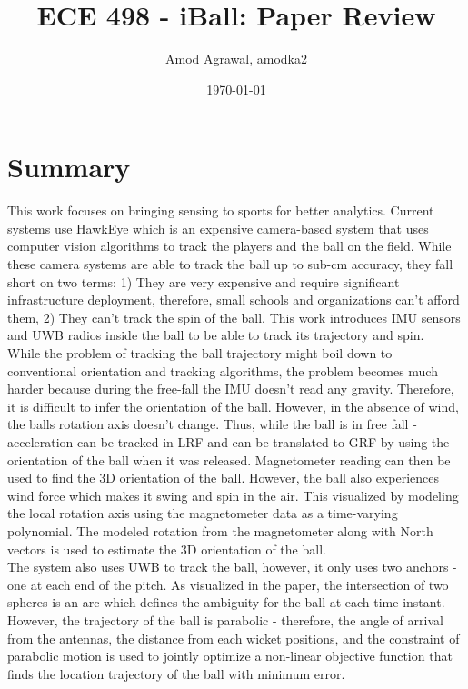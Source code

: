 \documentclass[a4paper]{article}
\title{ECE 498 - iBall: Paper Review}
\author{Amod Agrawal, amodka2}
\date{\today}
\begin{document}
\maketitle
\section{Summary}
This work focuses on bringing sensing to sports for better analytics. Current systems use HawkEye which is an expensive camera-based system that uses computer vision algorithms to track the players and the ball on the field. While these camera systems are able to track the ball up to sub-cm accuracy, they fall short on two terms: 1) They are very expensive and require significant infrastructure deployment, therefore, small schools and organizations can't afford them, 2) They can't track the spin of the ball. This work introduces IMU sensors and UWB radios inside the ball to be able to track its trajectory and spin.\\

While the problem of tracking the ball trajectory might boil down to conventional orientation and tracking algorithms, the problem becomes much harder because during the free-fall the IMU doesn't read any gravity. Therefore, it is difficult to infer the orientation of the ball. However, in the absence of wind, the balls rotation axis doesn't change. Thus, while the ball is in free fall - acceleration can be tracked in LRF and can be translated to GRF by using the orientation of the ball when it was released. Magnetometer reading can then be used to find the 3D orientation of the ball. However, the ball also experiences wind force which makes it swing and spin in the air. This visualized by modeling the local rotation axis using the magnetometer data as a time-varying polynomial. The modeled rotation from the magnetometer along with North vectors is used to estimate the 3D orientation of the ball. \\

The system also uses UWB to track the ball, however, it only uses two anchors - one at each end of the pitch. As visualized in the paper, the intersection of two spheres is an arc which defines the ambiguity for the ball at each time instant. However, the trajectory of the ball is parabolic - therefore, the angle of arrival from the antennas, the distance from each wicket positions, and the constraint of parabolic motion is used to jointly optimize a non-linear objective function that finds the location trajectory of the ball with minimum error. 
\end{document}
